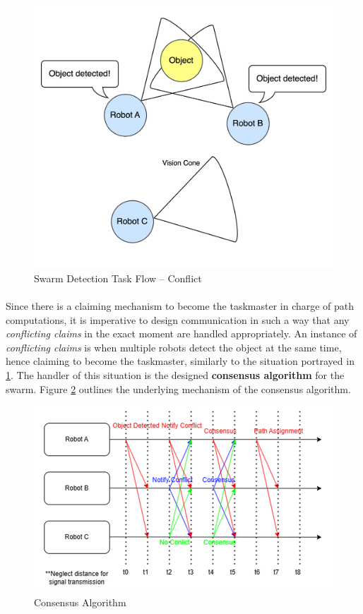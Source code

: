 \begin{figure} [H]
    \centering
    \includegraphics[width=0.6\linewidth]{assets/images/communication/swarm-detection-task-flow-conflict.png}
    \caption{Swarm Detection Task Flow -- Conflict}
    \label{fig:swarm-detection-task-conflict}
\end{figure}

\paragraph*{}
Since there is a claiming mechanism to become the taskmaster in charge of path computations, it is imperative to design communication in such a way that any \textit{conflicting claims} in the exact moment are handled appropriately. An instance of \textit{conflicting claims} is when multiple robots detect the object at the same time, hence claiming to become the taskmaster, similarly to the situation portrayed in \ref{fig:swarm-detection-task-conflict}. The handler of this situation is the designed \textbf{consensus algorithm} for the swarm. Figure \ref{fig:consensus-algorithm} outlines the underlying mechanism of the consensus algorithm.

\begin{figure} [H]
    \centering
    \includegraphics[width=0.9\linewidth]{assets/images/communication/consensus.png}
    \caption{Consensus Algorithm}
    \label{fig:consensus-algorithm}
\end{figure}

